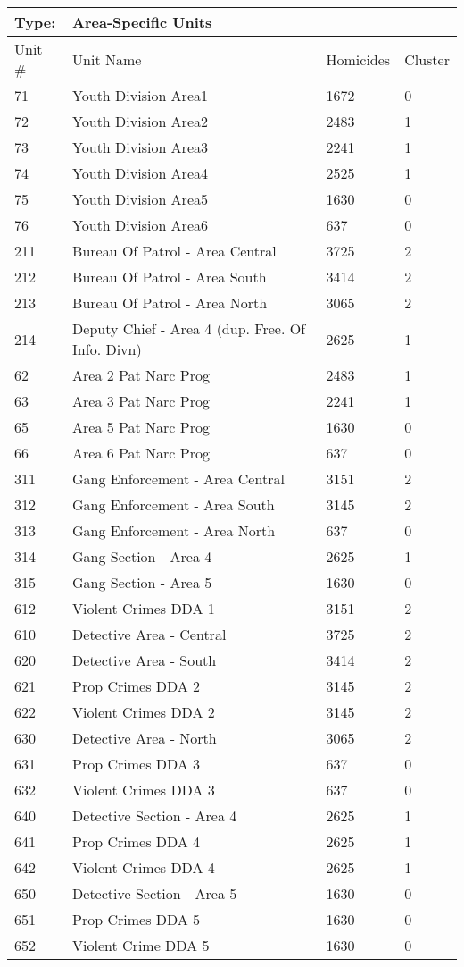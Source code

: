 \begin{table}
\tiny
\centering
\caption{}\label{tab:area}
\begin{tabular}{|llll|}
\hline
Type: &	\textbf{Area-Specific Units}  & &\\
\hline
Unit \# &Unit Name & Homicides & Cluster  \\
\hline
71	&Youth Division Area1	&1672	&0\\
72	&Youth Division Area2	&2483	&1\\
73	&Youth Division Area3	&2241	&1\\
74	&Youth Division Area4	&2525	&1\\
75	&Youth Division Area5	&1630	&0\\
76	&Youth Division Area6	&637	&0\\
211	&Bureau Of Patrol - Area Central&3725	&2\\
212	&Bureau Of Patrol - Area South	&3414	&2\\
213	&Bureau Of Patrol - Area North	&3065	&2\\
214	&Deputy Chief - Area 4 (dup. Free. Of Info. Divn)&2625	&1\\
62	&Area 2 Pat Narc Prog	&2483	&1\\
63	&Area 3 Pat Narc Prog	&2241	&1\\
65	&Area 5 Pat Narc Prog	&1630	&0\\
66	&Area 6 Pat Narc Prog	&637	&0\\
311	&Gang Enforcement - Area Central&3151	&2\\
312	&Gang Enforcement - Area South	&3145	&2\\
313	&Gang Enforcement - Area North	&637	&0\\
314	&Gang Section - Area 4	&2625	&1\\
315	&Gang Section - Area 5	&1630	&0\\
612	&Violent Crimes DDA 1	&3151	&2\\
610	&Detective Area - Central	&3725	&2\\
620	&Detective Area - South	&3414	&2\\
621	&Prop Crimes DDA 2	&3145	&2\\
622	&Violent Crimes DDA 2	&3145	&2\\
630	&Detective Area - North	&3065	&2\\
631	&Prop Crimes DDA 3	&637	&0\\
632	&Violent Crimes DDA 3	&637	&0\\
640	&Detective Section - Area 4	&2625	&1\\
641	&Prop Crimes DDA 4	&2625	&1\\
642	&Violent Crimes DDA 4	&2625	&1\\
650	&Detective Section - Area 5	&1630	&0\\
651	&Prop Crimes DDA 5	&1630	&0\\
652	&Violent Crime DDA 5	&1630	&0\\
\hline
\end{tabular}
\end{table}


